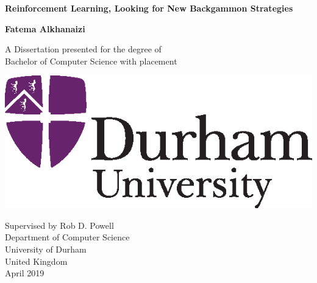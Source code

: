 
\setcounter{page}{1}

\newpage

\thispagestyle{empty}
\begin{center}
  \vspace*{1cm}
  {\Huge \bf Reinforcement Learning, Looking for New Backgammon Strategies}

  \vspace*{2cm}
  {\LARGE\bf Fatema Alkhanaizi}

  \vfill

  {\Large A Dissertation presented for the degree of\\
         [1mm] Bachelor of Computer Science with placement}
  \vspace*{0.9cm}
  
   \begin{center}
   \includegraphics{DU_2-col_sml.eps}
   \end{center}

  {\large Supervised by Rob D. Powell\\
          [-3mm] Department of Computer Science\\
          [-3mm] University of Durham\\
          [-3mm] United Kingdom\\
          [1mm]  April 2019}

\end{center}


